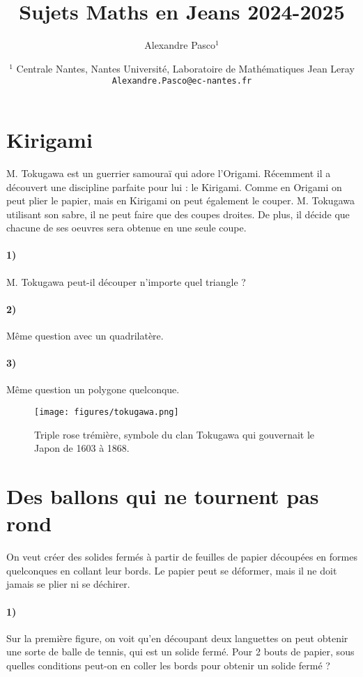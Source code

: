 \documentclass[a4paper,10pt,oneside]{article}
\title{Sujets Maths en Jeans 2024-2025}
\author{
  Alexandre Pasco${}^{1}$}
\date{\medskip%
  \small %
  ${}^1$  Centrale Nantes, Nantes Université, Laboratoire de Mathématiques Jean Leray\\
  \texttt{Alexandre.Pasco@ec-nantes.fr}
  }
\begin{document}
\maketitle


\clearpage
\section{Kirigami}

M. Tokugawa est un guerrier samouraï qui adore l'Origami.
Récemment il a découvert une discipline parfaite pour lui : le Kirigami.
Comme en Origami on peut plier le papier, mais en Kirigami on peut également le couper.
M. Tokugawa utilisant son sabre, il ne peut faire que des coupes droites.
De plus, il décide que chacune de ses oeuvres sera obtenue en une seule coupe.


\paragraph*{1)}
M. Tokugawa peut-il découper n'importe quel triangle ?

\paragraph*{2)}
Même question avec un quadrilatère.

\paragraph*{3)}
Même question un polygone quelconque.

\vspace{3cm}
\begin{figure}[!ht]
  \centering
  \texttt{[image: figures/tokugawa.png]}
  \caption*{Triple rose trémière, symbole du clan Tokugawa qui gouvernait le Japon de 1603 à 1868.}
\end{figure}



\clearpage
\section{Des ballons qui ne tournent pas rond}

On veut créer des solides fermés à partir de feuilles de papier découpées en formes quelconques en collant leur bords.
Le papier peut se déformer, mais il ne doit jamais se plier ni se déchirer.

\paragraph*{1)}
Sur la première figure, on voit qu'en découpant deux languettes on peut obtenir une sorte de balle de tennis, qui est un solide fermé.
Pour 2 bouts de papier, sous quelles conditions peut-on en coller les bords pour obtenir un solide fermé ?
\end{document}
